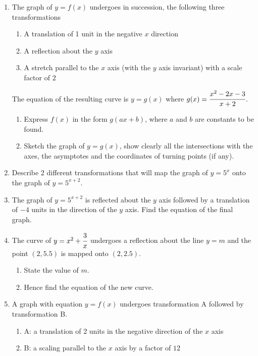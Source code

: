 \documentclass[letterpaper]{article}
\begin{document}
\begin{enumerate}

\item The graph of $y=f(x)$ undergoes in succession, the following three transformations

\begin{enumerate}
\item A translation of 1 unit in the negative $x$ direction
\item A reflection about the $y$ axis
\item A stretch parallel to the $x$ axis (with the $y$ axis invariant) with a scale factor of $2$
\end{enumerate}

The equation of the resulting curve is $y=g(x)$ where $g(x) = \cfrac{x^2 - 2x - 3}{x + 2}$.

\begin{enumerate}
\item Express $f(x)$ in the form $g(ax+b)$, where $a$ and $b$ are constants to be found.
\item Sketch the graph of $y=g(x)$, show clearly all the intersections with the axes, the asymptotes and the coordinates of turning points (if any).
\end{enumerate}

\item Describe 2 different transformations that will map the graph of $y=5^x$ onto the graph of $y=5^{x+2}$.

\item The graph of $y = 5^{x+2}$ is reflected about the $y$ axis followed by a translation of $-4$ units in the direction of the $y$ axis. Find the equation of the final graph.

\item The curve of $y=x^2 + \cfrac{3}{x}$ undergoes a reflection about the line $y=m$ and the point $(2,5.5)$ is mapped onto $(2,2.5)$.

\begin{enumerate}
\item State the value of $m$.
\item Hence find the equation of the new curve.
\end{enumerate}

\item A graph with equation $y=f(x)$ undergoes transformation A followed by transformation B.

\begin{enumerate}
\item A: a translation of 2 units in the negative direction of the $x$ axis
\item B: a scaling parallel to the $x$ axis by a factor of $12$
\end{enumerate}


\end{enumerate}
\end{document}
